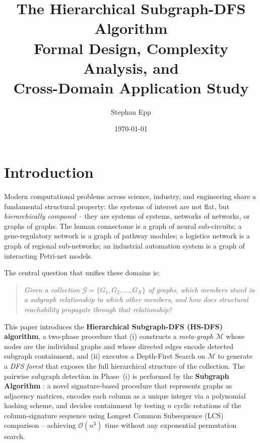 ﻿\documentclass[12pt,a4paper]{article}
\title{\textbf{The Hierarchical Subgraph-DFS Algorithm}\\[6pt]
	\large Formal Design, Complexity Analysis, and\\
	Cross-Domain Application Study}
\author{Stephan Epp}
\date{\today}
\theoremstyle{plain}
\theoremstyle{definition}
\theoremstyle{remark}
\begin{document}
	\maketitle
	\tableofcontents
	\newpage
	
	\section{Introduction}
	\label{sec:intro}
	
	Modern computational problems across science, industry, and engineering share
	a fundamental structural property: the systems of interest are not flat, but
	\emph{hierarchically composed} -- they are systems of systems, networks of
	networks, or graphs of graphs.  The human connectome is a graph of neural
	sub-circuits; a gene-regulatory network is a graph of pathway modules; a
	logistics network is a graph of regional sub-networks; an industrial
	automation system is a graph of interacting Petri-net models.
	
	The central question that unifies these domains is:
	\begin{quote}
		\emph{Given a collection $\mathcal{G} = \{G_1, G_2, \ldots, G_N\}$ of
			graphs, which members stand in a subgraph relationship to which other
			members, and how does structural reachability propagate through that
			relationship?}
	\end{quote}
	
	This paper introduces the \textbf{Hierarchical Subgraph-DFS (HS-DFS) algorithm},
	a two-phase procedure that (i) constructs a \emph{meta-graph} $\mathcal{M}$
	whose nodes are the individual graphs and whose directed edges encode detected
	subgraph containment, and (ii) executes a Depth-First Search on $\mathcal{M}$
	to generate a \emph{DFS forest} that exposes the full hierarchical structure of
	the collection.  The pairwise subgraph detection in Phase~(i) is performed
	by the \textbf{Subgraph Algorithm} \cite{epp2026subgraph}: a novel
	signature-based procedure that represents graphs as adjacency matrices,
	encodes each column as a unique integer via a polynomial hashing scheme,
	and decides containment by testing $n$ cyclic rotations of the
	column-signature sequence using Longest Common Subsequence (LCS)
	comparison -- achieving $\mathcal{O}(n^3)$ time without any exponential
	permutation search.
	
\end{document}
